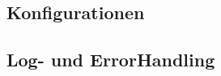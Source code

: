 \clearpage

\clearpage

\clearpage

\clearpage


\clearpage
\subsection{Konfigurationen}



\clearpage

\clearpage



\clearpage
\subsection{Log- und ErrorHandling}


\clearpage

\clearpage

\clearpage



